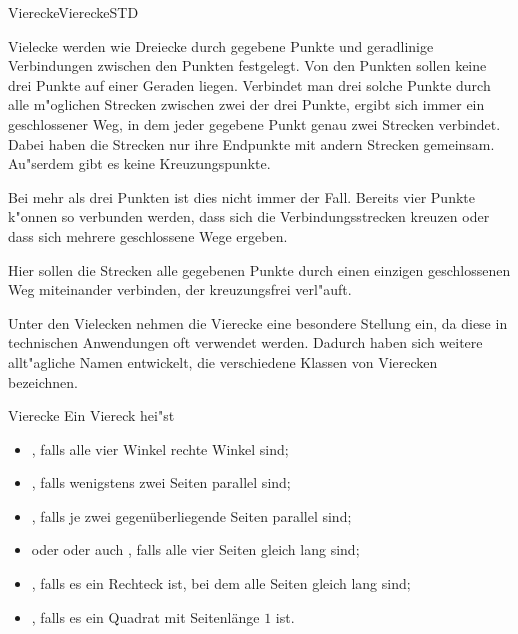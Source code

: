 \begin{MXContent}{Vierecke}{Vierecke}{STD}

Vielecke werden wie Dreiecke durch gegebene Punkte und geradlinige Verbindungen
zwischen den Punkten festgelegt. Von den Punkten sollen keine drei Punkte auf
einer Geraden liegen. Verbindet man drei solche Punkte durch alle m"oglichen 
Strecken zwischen zwei der drei Punkte, ergibt sich immer ein geschlossener Weg,
in dem jeder gegebene Punkt genau zwei Strecken verbindet. 
Dabei haben die Strecken nur ihre Endpunkte mit andern Strecken gemeinsam. 
Au"serdem gibt es keine Kreuzungspunkte.

Bei mehr als drei Punkten ist dies nicht immer der Fall. Bereits vier Punkte 
k"onnen so verbunden werden, dass sich die Verbindungsstrecken kreuzen oder 
dass sich mehrere geschlossene Wege ergeben.

Hier sollen die Strecken alle gegebenen Punkte durch einen einzigen 
geschlossenen Weg miteinander verbinden, der kreuzungsfrei verl"auft.

Unter den Vielecken nehmen die Vierecke eine besondere Stellung ein, da 
diese in technischen Anwendungen oft verwendet werden. Dadurch haben sich 
weitere allt"agliche Namen entwickelt, die verschiedene Klassen von Vierecken 
bezeichnen.

\begin{MXInfo}{Vierecke}%
Ein Viereck hei"st
\begin{itemize}
 \item {}, falls alle vier Winkel rechte Winkel sind;
 \item {}, falls wenigstens zwei Seiten parallel sind;
 \item {}, falls je zwei 
  gegen\"uberliegende Seiten parallel sind;
 \item {} oder  oder 
  auch , falls alle vier Seiten gleich lang sind;
 \item {}, falls es ein Rechteck ist, bei dem alle 
  Seiten gleich lang sind;
 \item {}, falls es ein Quadrat mit 
  Seitenl\"ange $1$ ist.
\end{itemize}
\end{MXInfo}


\end{MXContent}
